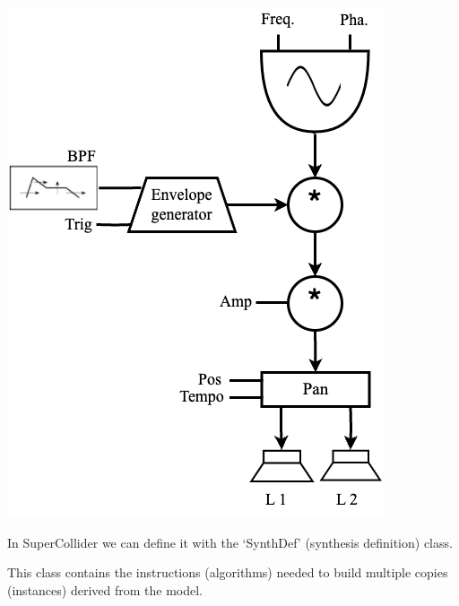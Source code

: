 \begin{center}
\includegraphics[scale=0.3]{../img/modello.png}
\end{center}

In SuperCollider we can define it with the `SynthDef' (synthesis definition) class.

This class contains the instructions (algorithms) needed to build multiple copies (instances) derived from the model.

